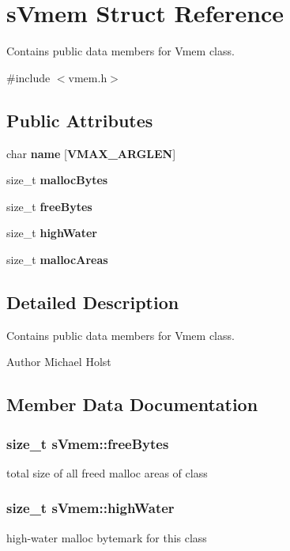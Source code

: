 \section{s\+Vmem Struct Reference}
\label{a00003}


Contains public data members for Vmem class.  




{\ttfamily \#include $<$vmem.\+h$>$}

\subsection*{Public Attributes}
\begin{DoxyCompactItemize}
\item 
char {\bf name} [{\bf V\+M\+A\+X\+\_\+\+A\+R\+G\+L\+E\+N}]
\item 
size\+\_\+t {\bf malloc\+Bytes}
\item 
size\+\_\+t {\bf free\+Bytes}
\item 
size\+\_\+t {\bf high\+Water}
\item 
size\+\_\+t {\bf malloc\+Areas}
\end{DoxyCompactItemize}


\subsection{Detailed Description}
Contains public data members for Vmem class. 

\begin{DoxyAuthor}{Author}
Michael Holst 
\end{DoxyAuthor}


\subsection{Member Data Documentation}
\subsubsection[{free\+Bytes}]{\setlength{\rightskip}{0pt plus 5cm}size\+\_\+t s\+Vmem\+::free\+Bytes}\label{a00003_ab27fc8fe9d21afcea1873ad370fd908b}
total size of all freed malloc areas of class 
\subsubsection[{high\+Water}]{\setlength{\rightskip}{0pt plus 5cm}size\+\_\+t s\+Vmem\+::high\+Water}\label{a00003_af47cf8b9bda257c19cf2866e14be131d}
high-\/water malloc bytemark for this class 
